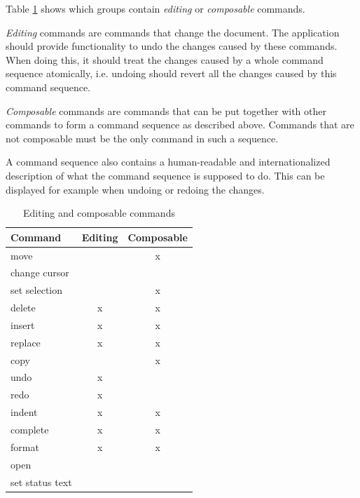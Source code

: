 \documentclass[a4paper]{article}
\begin{document}
Table \ref{tb:categories} shows which groups contain \emph{editing} or \emph{composable} commands.

\emph{Editing} commands are commands that change the document. The application should provide functionality to undo the changes caused by these commands. When doing this, it should treat the changes caused by a whole command sequence atomically, i.e. undoing should revert all the changes caused by this command sequence.

\emph{Composable} commands are commands that can be put together with other commands to form a command sequence as described above. Commands that are not composable must be the only command in such a sequence.

A command sequence also contains a human-readable and internationalized description of what the command sequence is supposed to do. This can be displayed for example when undoing or redoing the changes.

\newpage

\begin{table}[p]
\centering
\begin{tabular}{|l|c|c|}
\hline
\textbf{Command} & \textbf{Editing} & \textbf{Composable}\\
\hline\hline
move	&   & x \\
\hline
change cursor	&   &   \\
\hline
set selection	&   & x \\
\hline
delete	& x & x \\
\hline
insert	& x & x \\
\hline
replace	& x & x \\
\hline
copy	&   & x \\
\hline
undo	& x &   \\
\hline
redo	& x &   \\
\hline
indent	& x & x \\
\hline
complete	& x & x \\
\hline
format	& x & x \\
\hline
open	&   &   \\
\hline
set status text	&   &   \\
\hline
\end{tabular}
\caption{Editing and composable commands}
\label{tb:categories}
\end{table}
\end{document}
